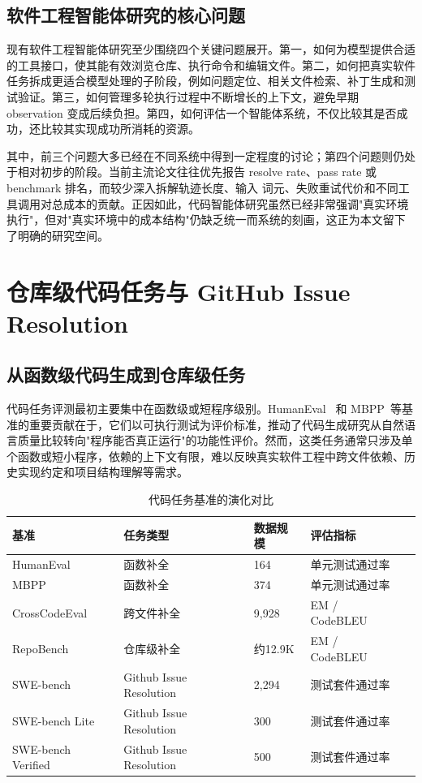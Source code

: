 \subsection{软件工程智能体研究的核心问题}

现有软件工程智能体研究至少围绕四个关键问题展开。第一，如何为模型提供合适的工具接口，使其能有效浏览仓库、执行命令和编辑文件。第二，如何把真实软件任务拆成更适合模型处理的子阶段，例如问题定位、相关文件检索、补丁生成和测试验证。第三，如何管理多轮执行过程中不断增长的上下文，避免早期 observation 变成后续负担。第四，如何评估一个智能体系统，不仅比较其是否成功，还比较其实现成功所消耗的资源。

其中，前三个问题大多已经在不同系统中得到一定程度的讨论；第四个问题则仍处于相对初步的阶段。当前主流论文往往优先报告 resolve rate、pass rate 或 benchmark 排名，而较少深入拆解轨迹长度、输入 词元、失败重试代价和不同工具调用对总成本的贡献。正因如此，代码智能体研究虽然已经非常强调"真实环境执行"，但对"真实环境中的成本结构"仍缺乏统一而系统的刻画，这正为本文留下了明确的研究空间。


\section{仓库级代码任务与 GitHub Issue Resolution}

\subsection{从函数级代码生成到仓库级任务}

代码任务评测最初主要集中在函数级或短程序级别。HumanEval~\cite{chen2021evaluating} 和 MBPP~\cite{austin2021program}等基准的重要贡献在于，它们以可执行测试为评价标准，推动了代码生成研究从自然语言质量比较转向"程序能否真正运行"的功能性评价。然而，这类任务通常只涉及单个函数或短小程序，依赖的上下文有限，难以反映真实软件工程中跨文件依赖、历史实现约定和项目结构理解等需求。

\begin{table}[htbp]
\centering
\caption{代码任务基准的演化对比}
\label{tab:bench-comparison}
\begin{tabular}{lllll}
\toprule
\textbf{基准} & \textbf{任务类型} & \textbf{数据规模}  & \textbf{评估指标} \\
\midrule
HumanEval   & 函数补全          & 164                        & 单元测试通过率 \\
MBPP        & 函数补全          & 374                       & 单元测试通过率 \\
CrossCodeEval & 跨文件补全      & 9,928                    & EM / CodeBLEU \\
RepoBench   & 仓库级补全        & 约12.9K                    & EM / CodeBLEU \\
SWE-bench   & Github Issue Resolution  & 2,294                    & 测试套件通过率 \\
SWE-bench Lite & Github Issue Resolution & 300                    & 测试套件通过率 \\
SWE-bench Verified & Github Issue Resolution & 500                & 测试套件通过率 \\
\bottomrule
\end{tabular}
\end{table}


